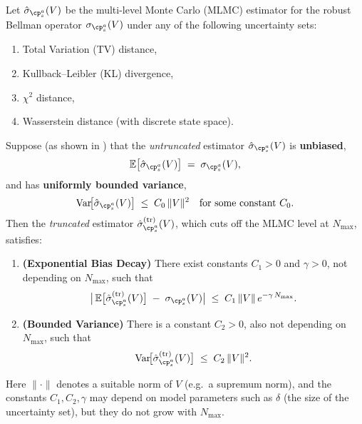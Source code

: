 \begin{theorem}
\label{thm:trunc-mlmc}
Let $\hat{\sigma}_{\cp^a_s}(V)$ be the multi-level Monte Carlo (MLMC) estimator for the robust Bellman operator $\sigma_{\cp^a_s}(V)$ under any of the following uncertainty sets:
\begin{enumerate}
  \item Total Variation (TV) distance,
  \item Kullback--Leibler (KL) divergence,
  \item $\chi^2$ distance,
  \item Wasserstein distance (with discrete state space).
\end{enumerate}
Suppose (as shown in \citep{wang2023model}) that the \emph{untruncated} estimator $\hat{\sigma}_{\cp^a_s}(V)$ is \textbf{unbiased},
\begin{equation}
  \mathbb{E}\bigl[\hat{\sigma}_{\cp^a_s}(V)\bigr]
  \;=\;
  \sigma_{\cp^a_s}(V),
\end{equation}
and has \textbf{uniformly bounded variance},
\begin{equation}
  \mathrm{Var}\!\bigl[\hat{\sigma}_{\cp^a_s}(V)\bigr]
  \;\le\;
  C_0\,\|V\|^2
  \quad\text{for some constant }C_0.
\end{equation}
Then the \emph{truncated} estimator $\hat{\sigma}_{\cp^a_s}^{(\mathrm{tr})}(V)$, which cuts off the MLMC level at $N_{\max}$, satisfies:

\begin{enumerate}
\item \textbf{(Exponential Bias Decay)} There exist constants $C_1>0$ and $\gamma>0$, not depending on $N_{\max}$, such that
\begin{equation}
  \bigl|\,
     \mathbb{E}\bigl[\hat{\sigma}_{\cp^a_s}^{(\mathrm{tr})}(V)\bigr]
     \;-\;
     \sigma_{\cp^a_s}(V)
  \bigr|
  \;\le\;
  C_1\,\|V\|\,
  e^{-\gamma\,N_{\max}}.
\end{equation}
\item \textbf{(Bounded Variance)} There is a constant $C_2>0$, also not depending on $N_{\max}$, such that
\begin{equation}
  \mathrm{Var}\!\bigl[\hat{\sigma}_{\cp^a_s}^{(\mathrm{tr})}(V)\bigr]
  \;\le\;
  C_2\,\|V\|^2.
\end{equation}
\end{enumerate}
Here $\|\cdot\|$ denotes a suitable norm of $V$ (e.g.\ a supremum norm), and the constants $C_1, C_2, \gamma$ may depend on model parameters such as $\delta$ (the size of the uncertainty set), but they do not grow with $N_{\max}$.
\end{theorem}


